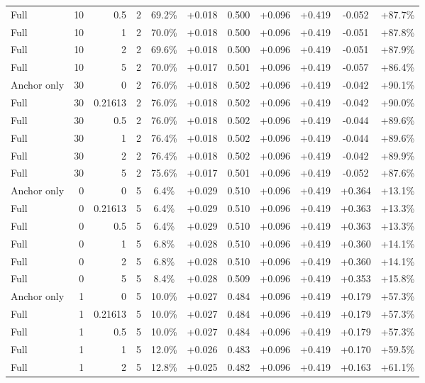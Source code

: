 \begin{table}[htbp]
\begin{tabular}{lrrrccccccc}
Full & 10 & 0.5 & 2 & 69.2\% & +0.018 & 0.500 & +0.096 & +0.419 & -0.052 & +87.7\% \\
Full & 10 & 1 & 2 & 70.0\% & +0.018 & 0.500 & +0.096 & +0.419 & -0.051 & +87.8\% \\
Full & 10 & 2 & 2 & 69.6\% & +0.018 & 0.500 & +0.096 & +0.419 & -0.051 & +87.9\% \\
Full & 10 & 5 & 2 & 70.0\% & +0.017 & 0.501 & +0.096 & +0.419 & -0.057 & +86.4\% \\
Anchor only & 30 & 0 & 2 & 76.0\% & +0.018 & 0.502 & +0.096 & +0.419 & -0.042 & +90.1\% \\
Full & 30 & 0.21613 & 2 & 76.0\% & +0.018 & 0.502 & +0.096 & +0.419 & -0.042 & +90.0\% \\
Full & 30 & 0.5 & 2 & 76.0\% & +0.018 & 0.502 & +0.096 & +0.419 & -0.044 & +89.6\% \\
Full & 30 & 1 & 2 & 76.4\% & +0.018 & 0.502 & +0.096 & +0.419 & -0.044 & +89.6\% \\
Full & 30 & 2 & 2 & 76.4\% & +0.018 & 0.502 & +0.096 & +0.419 & -0.042 & +89.9\% \\
Full & 30 & 5 & 2 & 75.6\% & +0.017 & 0.501 & +0.096 & +0.419 & -0.052 & +87.6\% \\
Anchor only & 0 & 0 & 5 & 6.4\% & +0.029 & 0.510 & +0.096 & +0.419 & +0.364 & +13.1\% \\
Full & 0 & 0.21613 & 5 & 6.4\% & +0.029 & 0.510 & +0.096 & +0.419 & +0.363 & +13.3\% \\
Full & 0 & 0.5 & 5 & 6.4\% & +0.029 & 0.510 & +0.096 & +0.419 & +0.363 & +13.3\% \\
Full & 0 & 1 & 5 & 6.8\% & +0.028 & 0.510 & +0.096 & +0.419 & +0.360 & +14.1\% \\
Full & 0 & 2 & 5 & 6.8\% & +0.028 & 0.510 & +0.096 & +0.419 & +0.360 & +14.1\% \\
Full & 0 & 5 & 5 & 8.4\% & +0.028 & 0.509 & +0.096 & +0.419 & +0.353 & +15.8\% \\
Anchor only & 1 & 0 & 5 & 10.0\% & +0.027 & 0.484 & +0.096 & +0.419 & +0.179 & +57.3\% \\
Full & 1 & 0.21613 & 5 & 10.0\% & +0.027 & 0.484 & +0.096 & +0.419 & +0.179 & +57.3\% \\
Full & 1 & 0.5 & 5 & 10.0\% & +0.027 & 0.484 & +0.096 & +0.419 & +0.179 & +57.3\% \\
Full & 1 & 1 & 5 & 12.0\% & +0.026 & 0.483 & +0.096 & +0.419 & +0.170 & +59.5\% \\
Full & 1 & 2 & 5 & 12.8\% & +0.025 & 0.482 & +0.096 & +0.419 & +0.163 & +61.1\% \\

\end{tabular}
\end{table}
